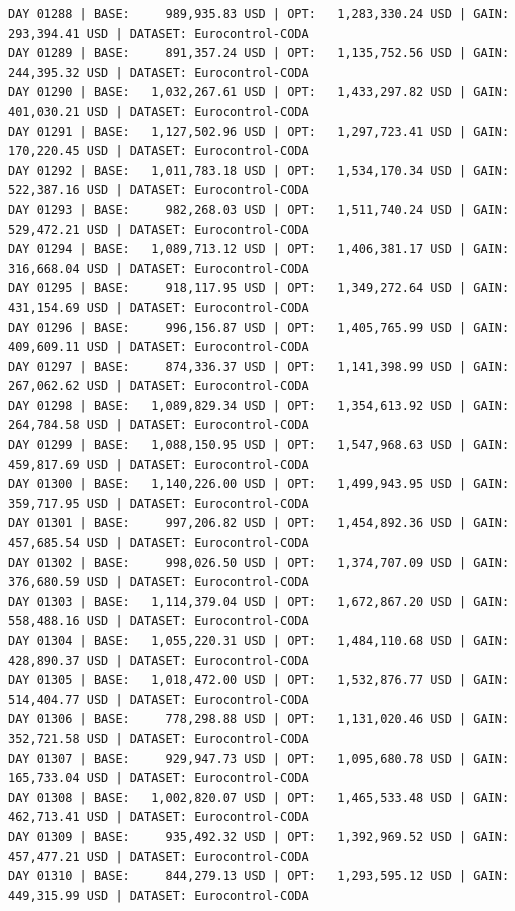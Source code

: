 \documentclass[11pt,a4paper]{article}
\begin{document}
\begin{verbatim}
DAY 01288 | BASE:     989,935.83 USD | OPT:   1,283,330.24 USD | GAIN: 293,394.41 USD | DATASET: Eurocontrol-CODA
DAY 01289 | BASE:     891,357.24 USD | OPT:   1,135,752.56 USD | GAIN: 244,395.32 USD | DATASET: Eurocontrol-CODA
DAY 01290 | BASE:   1,032,267.61 USD | OPT:   1,433,297.82 USD | GAIN: 401,030.21 USD | DATASET: Eurocontrol-CODA
DAY 01291 | BASE:   1,127,502.96 USD | OPT:   1,297,723.41 USD | GAIN: 170,220.45 USD | DATASET: Eurocontrol-CODA
DAY 01292 | BASE:   1,011,783.18 USD | OPT:   1,534,170.34 USD | GAIN: 522,387.16 USD | DATASET: Eurocontrol-CODA
DAY 01293 | BASE:     982,268.03 USD | OPT:   1,511,740.24 USD | GAIN: 529,472.21 USD | DATASET: Eurocontrol-CODA
DAY 01294 | BASE:   1,089,713.12 USD | OPT:   1,406,381.17 USD | GAIN: 316,668.04 USD | DATASET: Eurocontrol-CODA
DAY 01295 | BASE:     918,117.95 USD | OPT:   1,349,272.64 USD | GAIN: 431,154.69 USD | DATASET: Eurocontrol-CODA
DAY 01296 | BASE:     996,156.87 USD | OPT:   1,405,765.99 USD | GAIN: 409,609.11 USD | DATASET: Eurocontrol-CODA
DAY 01297 | BASE:     874,336.37 USD | OPT:   1,141,398.99 USD | GAIN: 267,062.62 USD | DATASET: Eurocontrol-CODA
DAY 01298 | BASE:   1,089,829.34 USD | OPT:   1,354,613.92 USD | GAIN: 264,784.58 USD | DATASET: Eurocontrol-CODA
DAY 01299 | BASE:   1,088,150.95 USD | OPT:   1,547,968.63 USD | GAIN: 459,817.69 USD | DATASET: Eurocontrol-CODA
DAY 01300 | BASE:   1,140,226.00 USD | OPT:   1,499,943.95 USD | GAIN: 359,717.95 USD | DATASET: Eurocontrol-CODA
DAY 01301 | BASE:     997,206.82 USD | OPT:   1,454,892.36 USD | GAIN: 457,685.54 USD | DATASET: Eurocontrol-CODA
DAY 01302 | BASE:     998,026.50 USD | OPT:   1,374,707.09 USD | GAIN: 376,680.59 USD | DATASET: Eurocontrol-CODA
DAY 01303 | BASE:   1,114,379.04 USD | OPT:   1,672,867.20 USD | GAIN: 558,488.16 USD | DATASET: Eurocontrol-CODA
DAY 01304 | BASE:   1,055,220.31 USD | OPT:   1,484,110.68 USD | GAIN: 428,890.37 USD | DATASET: Eurocontrol-CODA
DAY 01305 | BASE:   1,018,472.00 USD | OPT:   1,532,876.77 USD | GAIN: 514,404.77 USD | DATASET: Eurocontrol-CODA
DAY 01306 | BASE:     778,298.88 USD | OPT:   1,131,020.46 USD | GAIN: 352,721.58 USD | DATASET: Eurocontrol-CODA
DAY 01307 | BASE:     929,947.73 USD | OPT:   1,095,680.78 USD | GAIN: 165,733.04 USD | DATASET: Eurocontrol-CODA
DAY 01308 | BASE:   1,002,820.07 USD | OPT:   1,465,533.48 USD | GAIN: 462,713.41 USD | DATASET: Eurocontrol-CODA
DAY 01309 | BASE:     935,492.32 USD | OPT:   1,392,969.52 USD | GAIN: 457,477.21 USD | DATASET: Eurocontrol-CODA
DAY 01310 | BASE:     844,279.13 USD | OPT:   1,293,595.12 USD | GAIN: 449,315.99 USD | DATASET: Eurocontrol-CODA

\end{verbatim}
\end{document}
